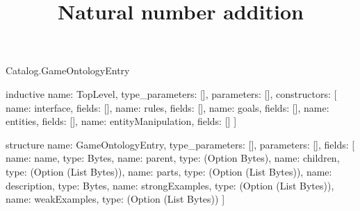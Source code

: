 \begin{lexlean}{Catalog.GameOntologyEntry}
\title{Natural number addition}
\begin{semanticmodule}
inductive{
  name: TopLevel,
  type_parameters: [],
  parameters: [],
  constructors: [
    {name: interface, fields: []},
    {name: rules, fields: []},
    {name: goals, fields: []},
    {name: entities, fields: []},
    {name: entityManipulation, fields: []}
  ]
}

structure{
  name: GameOntologyEntry,
  type_parameters: [],
  parameters: [],
  fields: [
    {name: name, type: Bytes},
    {name: parent, type: (Option Bytes)},
    {name: children, type: (Option (List Bytes))},
    {name: parts, type: (Option (List Bytes))},
    {name: description, type: Bytes},
    {name: strongExamples, type: (Option (List Bytes))},
    {name: weakExamples, type: (Option (List Bytes))}
  ]
}
\end{semanticmodule}
\end{lexlean}
